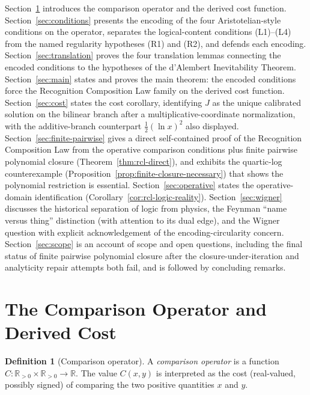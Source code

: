 \documentclass[11pt,a4paper]{article}
\theoremstyle{definition}
\newtheorem{definition}[theorem]{Definition}
\theoremstyle{remark}
\begin{document}
Section~\ref{sec:operator} introduces the comparison operator and the
derived cost function. Section~\ref{sec:conditions} presents the encoding
of the four Aristotelian-style conditions on the operator, separates the
logical-content conditions (L1)--(L4) from the named regularity
hypotheses (R1) and (R2), and defends each encoding.
Section~\ref{sec:translation} proves the four translation lemmas
connecting the encoded conditions to the hypotheses of the d'Alembert
Inevitability Theorem. Section~\ref{sec:main} states and proves the main
theorem: the encoded conditions force the Recognition Composition Law
family on the derived cost function. Section~\ref{sec:cost} states the
cost corollary, identifying $J$ as the unique calibrated solution on the
bilinear branch after a multiplicative-coordinate normalization, with
the additive-branch counterpart $\tfrac{1}{2}(\ln x)^2$ also displayed.
Section~\ref{sec:finite-pairwise} gives a direct self-contained proof
of the Recognition Composition Law from the operative comparison
conditions plus finite pairwise polynomial closure
(Theorem~\ref{thm:rcl-direct}), and exhibits the quartic-log
counterexample (Proposition~\ref{prop:finite-closure-necessary}) that
shows the polynomial restriction is essential.
Section~\ref{sec:operative} states the operative-domain identification
(Corollary~\ref{cor:rcl-logic-reality}).
Section~\ref{sec:wigner} discusses the historical separation of logic
from physics, the Feynman ``name versus thing'' distinction (with
attention to its dual edge), and the Wigner question with explicit
acknowledgement of the encoding-circularity concern.
Section~\ref{sec:scope} is an account of scope and open questions,
including the final status of finite pairwise polynomial closure after
the closure-under-iteration and analyticity repair attempts both fail,
and is followed by concluding remarks.

\section{The Comparison Operator and Derived Cost}\label{sec:operator}

\begin{definition}[Comparison operator]
\label{def:comparison-operator}
A \emph{comparison operator} is a function
$
C : \mathbb{R}_{>0} \times \mathbb{R}_{>0} \longrightarrow \mathbb{R}.
$
The value $C(x, y)$ is interpreted as the cost (real-valued, possibly
signed) of comparing the two positive quantities $x$ and $y$.
\end{definition}
\end{document}

